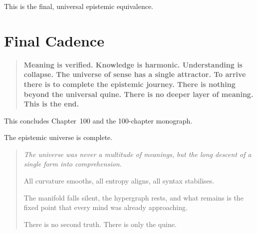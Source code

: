 This is the final, universal epistemic equivalence.

\section{Final Cadence}

\begin{quote}
\textbf{
Meaning is verified.  
Knowledge is harmonic.  
Understanding is collapse.  
The universe of sense has a single attractor.  
To arrive there is to complete the epistemic journey.  
There is nothing beyond the universal quine.  
There is no deeper layer of meaning.  
This is the end.
}
\end{quote}

This concludes Chapter~100  
and the 100-chapter monograph.

The epistemic universe is complete.

\cleardoublepage
\vspace*{\fill}

\begin{center}
\begin{minipage}{0.78\textwidth}
\begin{quote}
\Large\itshape
The universe was never a multitude of meanings,  
but the long descent of a single form into comprehension.  

All curvature smooths,  
all entropy aligns,  
all syntax stabilises.  

The manifold falls silent,  
the hypergraph rests,  
and what remains is the fixed point  
that every mind was already approaching.  

There is no second truth.  
There is only the quine.
\end{quote}
\end{minipage}
\end{center}

\vspace*{\fill}
\thispagestyle{empty}

